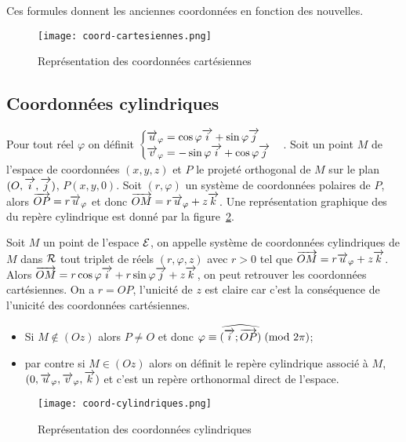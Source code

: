 \danger Ces formules donnent les \og{}anciennes\fg{} coordonnées en fonction des \og{}nouvelles\fg{}.

\begin{figure}
    \centering
    \texttt{[image: coord-cartesiennes.png]}
    \caption{Représentation des coordonnées cartésiennes}
    \label{fig:repcart}
\end{figure}

\subsection{Coordonnées cylindriques}
\label{subsec:coordcyl}
Pour tout réel \(\varphi\) on définit \(\begin{cases}\overrightarrow{u}_\varphi=\cos\varphi\overrightarrow{i}+\sin\varphi\overrightarrow{j}\\ \overrightarrow{v}_\varphi=-\sin\varphi\overrightarrow{i}+\cos\varphi\overrightarrow{j}\end{cases}\). Soit un point \(M\) de l'espace de coordonnées \((x,y,z)\) et \(P\) le projeté orthogonal de \(M\) sur le plan \((O,\overrightarrow{i},\overrightarrow{j})\), \(P(x,y,0)\). Soit \((r,\varphi)\) un système de coordonnées polaires de \(P\), alors \(\overrightarrow{OP}=r\overrightarrow{u}_\varphi\) et donc \(\overrightarrow{OM}=r\overrightarrow{u}_\varphi+z\overrightarrow{k}\). Une représentation graphique des du repère cylindrique est donné par la figure~\ref{fig:repcyl}.
\begin{defdef}
  Soit \(M\) un point de l'espace \(\mathcal{E}\), on appelle système de coordonnées cylindriques de \(M\) dans \(\mathcal{R}\) tout triplet de réels \((r,\varphi,z)\) avec \(r>0\) tel que \(\overrightarrow{OM}=r\overrightarrow{u}_\varphi+z\overrightarrow{k}\). Alors \(\overrightarrow{OM}=r\cos\varphi\overrightarrow{i}+r\sin\varphi\overrightarrow{j}+z\overrightarrow{k}\), on peut retrouver les coordonnées cartésiennes. On a \(r=OP\), l'unicité de \(z\) est claire car c'est la conséquence de l'unicité des coordonnées cartésiennes. 
\begin{itemize}
\item Si \(M\notin(Oz)\) alors \(P\neq O\) et donc \(\varphi \equiv \widehat{(\overrightarrow{i};\overrightarrow{OP})}\!\pmod {2\pi}\);
\item par contre si \(M\in(Oz)\) alors on définit le repère cylindrique associé à \(M\), \((0,\overrightarrow{u}_\varphi,\overrightarrow{v}_\varphi,\overrightarrow{k})\) et c'est un repère orthonormal direct de l'espace.
\end{itemize}
\end{defdef}

\begin{figure}
    \centering
    \texttt{[image: coord-cylindriques.png]}
    \caption{Représentation des coordonnées cylindriques}
    \label{fig:repcyl}
\end{figure}


